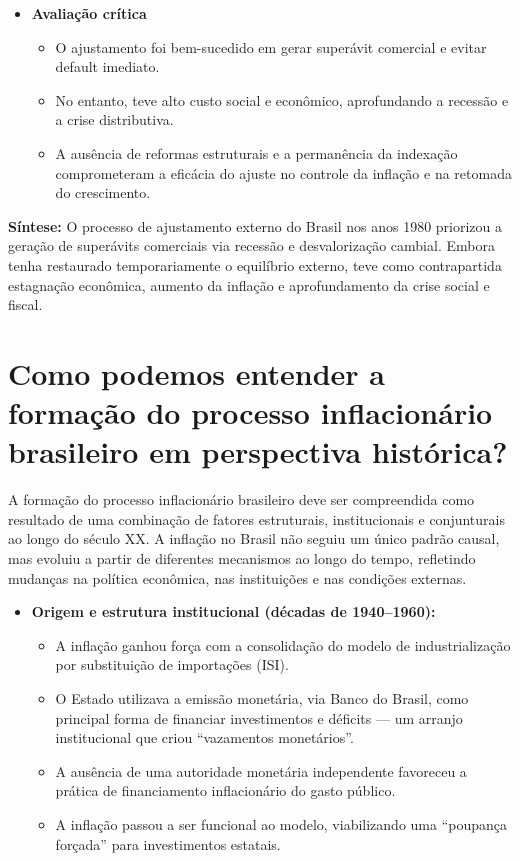 \documentclass{sciposter}
\begin{document}
\begin{multicols}{3}
\begin{itemize}
    \item \textbf{ Avaliação crítica}
    \begin{itemize}
        \item O ajustamento foi bem-sucedido em gerar superávit comercial e evitar default imediato.
        \item No entanto, teve alto custo social e econômico, aprofundando a recessão e a crise distributiva.
        \item A ausência de reformas estruturais e a permanência da indexação comprometeram a eficácia do ajuste no controle da inflação e na retomada do crescimento.
    \end{itemize}
\end{itemize}

\textbf{Síntese:} O processo de ajustamento externo do Brasil nos anos 1980 priorizou a geração de superávits comerciais via recessão e desvalorização cambial. Embora tenha restaurado temporariamente o equilíbrio externo, teve como contrapartida estagnação econômica, aumento da inflação e aprofundamento da crise social e fiscal.

\section{\textbf{Como podemos entender a formação do processo inflacionário brasileiro em perspectiva histórica?}}

A formação do processo inflacionário brasileiro deve ser compreendida como resultado de uma combinação de fatores estruturais, institucionais e conjunturais ao longo do século XX. A inflação no Brasil não seguiu um único padrão causal, mas evoluiu a partir de diferentes mecanismos ao longo do tempo, refletindo mudanças na política econômica, nas instituições e nas condições externas.

\begin{itemize}
    \item \textbf{ Origem e estrutura institucional (décadas de 1940–1960):}
    \begin{itemize}
        \item A inflação ganhou força com a consolidação do modelo de industrialização por substituição de importações (ISI).
        \item O Estado utilizava a emissão monetária, via Banco do Brasil, como principal forma de financiar investimentos e déficits — um arranjo institucional que criou “vazamentos monetários”.
        \item A ausência de uma autoridade monetária independente favoreceu a prática de financiamento inflacionário do gasto público.
        \item A inflação passou a ser funcional ao modelo, viabilizando uma “poupança forçada” para investimentos estatais.
    \end{itemize}


\end{itemize}
\end{multicols}
\end{document}
